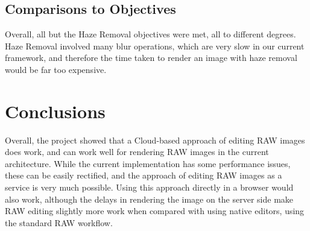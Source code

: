 \documentclass[10pt,a4paper]{article}
\begin{document}
\subsection{Comparisons to Objectives}

Overall, all but the Haze Removal objectives were met, all to different degrees. Haze Removal involved many blur operations, which are very slow in our current framework, and therefore the
time taken to render an image with haze removal would be far too expensive. 

\section{Conclusions}
Overall, the project showed that a Cloud-based approach of editing RAW images does work, and can work well for rendering RAW images in the current architecture.
While the current implementation has some performance issues, these can be easily rectified, and the approach of editing RAW images as a service is very much possible.
Using this approach directly in a browser would also work, although the delays in rendering the image on the server side make RAW editing slightly more work when compared with
using native editors, using the standard RAW workflow.


\end{document}
